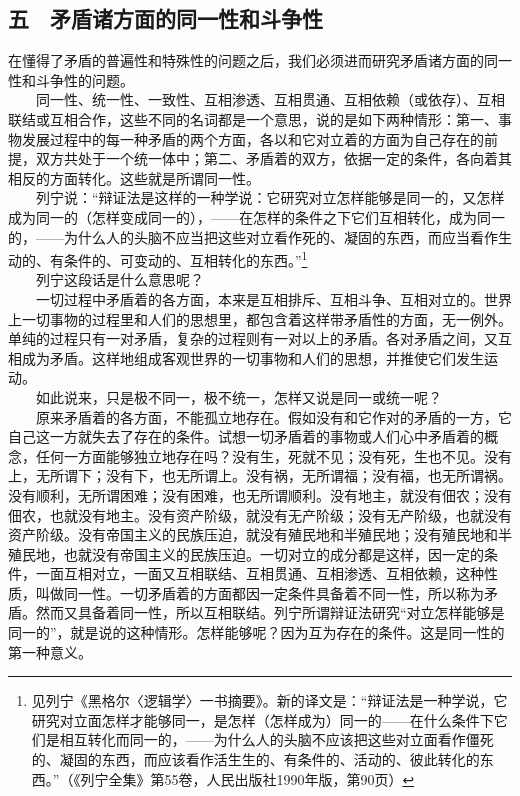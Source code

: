 \documentclass[cn,11pt,chinese]{elegantbook}
\def\myformat#1{\hfil\hfil #1}
\begin{document}
\subsection*{\myformat{五　矛盾诸方面的同一性和斗争性}}
在懂得了矛盾的普遍性和特殊性的问题之后，我们必须进而研究矛盾诸方面的同一性和斗争性的问题。\\
　　同一性、统一性、一致性、互相渗透、互相贯通、互相依赖（或依存）、互相联结或互相合作，这些不同的名词都是一个意思，说的是如下两种情形：第一、事物发展过程中的每一种矛盾的两个方面，各以和它对立着的方面为自己存在的前提，双方共处于一个统一体中；第二、矛盾着的双方，依据一定的条件，各向着其相反的方面转化。这些就是所谓同一性。\\
　　列宁说：“辩证法是这样的一种学说：它研究对立怎样能够是同一的，又怎样成为同一的（怎样变成同一的），——在怎样的条件之下它们互相转化，成为同一的，——为什么人的头脑不应当把这些对立看作死的、凝固的东西，而应当看作生动的、有条件的、可变动的、互相转化的东西。”\footnote[26]{ 见列宁《黑格尔〈逻辑学〉一书摘要》。新的译文是：“辩证法是一种学说，它研究对立面怎样才能够同一，是怎样（怎样成为）同一的——在什么条件下它们是相互转化而同一的，——为什么人的头脑不应该把这些对立面看作僵死的、凝固的东西，而应该看作活生生的、有条件的、活动的、彼此转化的东西。”（《列宁全集》第55卷，人民出版社1990年版，第90页）}\\
　　列宁这段话是什么意思呢？\\
　　一切过程中矛盾着的各方面，本来是互相排斥、互相斗争、互相对立的。世界上一切事物的过程里和人们的思想里，都包含着这样带矛盾性的方面，无一例外。单纯的过程只有一对矛盾，复杂的过程则有一对以上的矛盾。各对矛盾之间，又互相成为矛盾。这样地组成客观世界的一切事物和人们的思想，并推使它们发生运动。\\
　　如此说来，只是极不同一，极不统一，怎样又说是同一或统一呢？\\
　　原来矛盾着的各方面，不能孤立地存在。假如没有和它作对的矛盾的一方，它自己这一方就失去了存在的条件。试想一切矛盾着的事物或人们心中矛盾着的概念，任何一方面能够独立地存在吗？没有生，死就不见；没有死，生也不见。没有上，无所谓下；没有下，也无所谓上。没有祸，无所谓福；没有福，也无所谓祸。没有顺利，无所谓困难；没有困难，也无所谓顺利。没有地主，就没有佃农；没有佃农，也就没有地主。没有资产阶级，就没有无产阶级；没有无产阶级，也就没有资产阶级。没有帝国主义的民族压迫，就没有殖民地和半殖民地；没有殖民地和半殖民地，也就没有帝国主义的民族压迫。一切对立的成分都是这样，因一定的条件，一面互相对立，一面又互相联结、互相贯通、互相渗透、互相依赖，这种性质，叫做同一性。一切矛盾着的方面都因一定条件具备着不同一性，所以称为矛盾。然而又具备着同一性，所以互相联结。列宁所谓辩证法研究“对立怎样能够是同一的”，就是说的这种情形。怎样能够呢？因为互为存在的条件。这是同一性的第一种意义。\\
\end{document}
